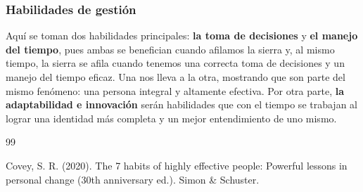 \documentclass[onecolumn]{article} %
\begin{document}
	\subsubsection{Habilidades de gestión}
	
	Aquí se toman dos habilidades principales: \textbf{la toma de decisiones} y \textbf{el manejo del tiempo}, pues ambas se benefician cuando afilamos la sierra y, al mismo tiempo, la sierra se afila cuando tenemos una correcta toma de decisiones y un manejo del tiempo eficaz. Una nos lleva a la otra, mostrando que son parte del mismo fenómeno: una persona integral y altamente efectiva. Por otra parte, \textbf{la adaptabilidad e innovación} serán habilidades que con el tiempo se trabajan al lograr una identidad más completa y un mejor entendimiento de uno mismo.
	
	
	\begin{thebibliography}{99}
		
		 Covey, S. R. (2020). The 7 habits of highly effective people: Powerful lessons in personal change (30th anniversary ed.). Simon \& Schuster. 
		
	\end{thebibliography}
	
	
\end{document}
